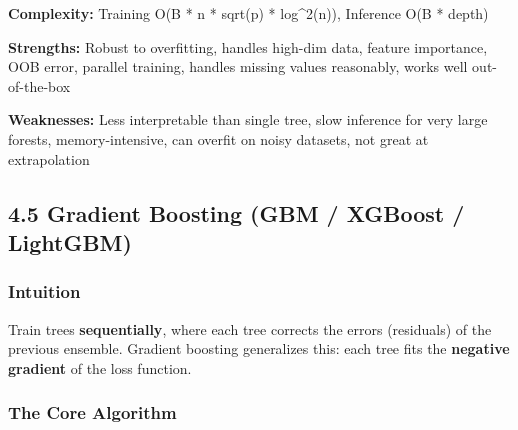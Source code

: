 \documentclass[11pt]{article}
\begin{document}
\textbf{Complexity:} Training O(B * n * sqrt(p) * log\^{}2(n)), Inference O(B * depth)

\textbf{Strengths:} Robust to overfitting, handles high-dim data, feature importance, OOB error, parallel training, handles missing values reasonably, works well out-of-the-box

\textbf{Weaknesses:} Less interpretable than single tree, slow inference for very large forests, memory-intensive, can overfit on noisy datasets, not great at extrapolation

\subsection{4.5 Gradient Boosting (GBM / XGBoost / LightGBM)}\label{45-gradient-boosting-gbm--xgboost--lightgbm}

\subsubsection{Intuition}\label{intuition-4}

Train trees \textbf{sequentially}, where each tree corrects the errors (residuals) of the previous ensemble. Gradient boosting generalizes this: each tree fits the \textbf{negative gradient} of the loss function.

\subsubsection{The Core Algorithm}\label{the-core-algorithm}

\end{document}
